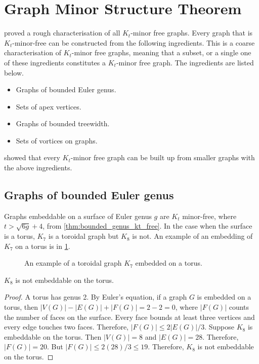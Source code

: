 \section{Graph Minor Structure Theorem}\label{sec:Kt_Minor_Free}
\textcite{robertsonGraphMinorsXVII1999} proved a rough characterisation of all \(K_t\)-minor free graphs. Every graph that is $K_t$-minor-free can be constructed from the following ingredients. This is a coarse characterisation of $K_t$-minor free graphs, meaning that a subset, or a single one of these ingredients constitutes a $K_t$-minor free graph. The ingredients are listed below.
\begin{itemize}
	\item Graphs of bounded Euler genus.
	\item Sets of apex vertices.
	\item Graphs of bounded treewidth.
	\item Sets of vortices on graphs.
\end{itemize}
\textcite{robertsonGraphMinorsXVII1999} showed that every \(K_t\)-minor free graph can be built up from smaller graphs with the above ingredients.

\subsection{Graphs of bounded Euler genus}

Graphs embeddable on a surface of Euler genus $g$ are $K_t$ minor-free, where \(t > \sqrt{6g} + 4\), from \cref{thm:bounded_genus_kt_free}. In the case when the surface is a torus, $K_7$ is a toroidal graph but $K_8$ is not. An example of an embedding of $K_7$ on a torus is in \cref{fig:k7_on_torus}.

\begin{figure}[h!]
	\centering
	
	\caption[Toroidal graph]{An example of a toroidal graph $K_7$ embedded on a torus.}\label{fig:k7_on_torus}
\end{figure}

\begin{proposition}
	$K_8$ is not embeddable on the torus.
\end{proposition}
\begin{proof}
	A torus has genus 2. By Euler's equation, if a graph $G$ is embedded on a torus, then $|V(G)| - |E(G)| + |F(G)| = 2 - 2 = 0$, where $|F(G)|$ counts the number of faces on the surface. Every face bounds at least three vertices and every edge touches two faces. Therefore, $|F(G)| \leq 2|E(G)|/3$. Suppose $K_8$ is embeddable on the torus. Then $|V(G)| = 8$ and $|E(G)| = 28$. Therefore, $|F(G)| = 20$. But $|F(G)| \leq 2 (28)/3 \leq 19$. Therefore, $K_8$ is not embeddable on the torus.
\end{proof}


